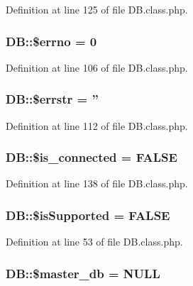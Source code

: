 Definition at line 125 of file D\+B.\+class.\+php.

\hypertarget{classDB_af99d759f7fb3bbadd579d72e686d1cf1}{
\subsubsection[{\$errno}]{\setlength{\rightskip}{0pt plus 5cm}D\+B\+::\$errno = 0}}\label{classDB_af99d759f7fb3bbadd579d72e686d1cf1}


Definition at line 106 of file D\+B.\+class.\+php.

\hypertarget{classDB_ae006f35821aba99713b834fa6a69e55b}{
\subsubsection[{\$errstr}]{\setlength{\rightskip}{0pt plus 5cm}D\+B\+::\$errstr = ''}}\label{classDB_ae006f35821aba99713b834fa6a69e55b}


Definition at line 112 of file D\+B.\+class.\+php.

\hypertarget{classDB_aac22b6ebcd8f78c2f70646d381f933dc}{
\subsubsection[{\$is\+\_\+connected}]{\setlength{\rightskip}{0pt plus 5cm}D\+B\+::\$is\+\_\+connected = F\+A\+L\+S\+E}}\label{classDB_aac22b6ebcd8f78c2f70646d381f933dc}


Definition at line 138 of file D\+B.\+class.\+php.

\hypertarget{classDB_a6b693edbdcdce5c86f42c050f62d8136}{
\subsubsection[{\$is\+Supported}]{\setlength{\rightskip}{0pt plus 5cm}D\+B\+::\$is\+Supported = F\+A\+L\+S\+E\hspace{0.3cm}{\ttfamily [static]}}}\label{classDB_a6b693edbdcdce5c86f42c050f62d8136}


Definition at line 53 of file D\+B.\+class.\+php.

\hypertarget{classDB_ad0a3ae175a659516131cfc6cd615d15c}{
\subsubsection[{\$master\+\_\+db}]{\setlength{\rightskip}{0pt plus 5cm}D\+B\+::\$master\+\_\+db = N\+U\+L\+L}}\label{classDB_ad0a3ae175a659516131cfc6cd615d15c}


